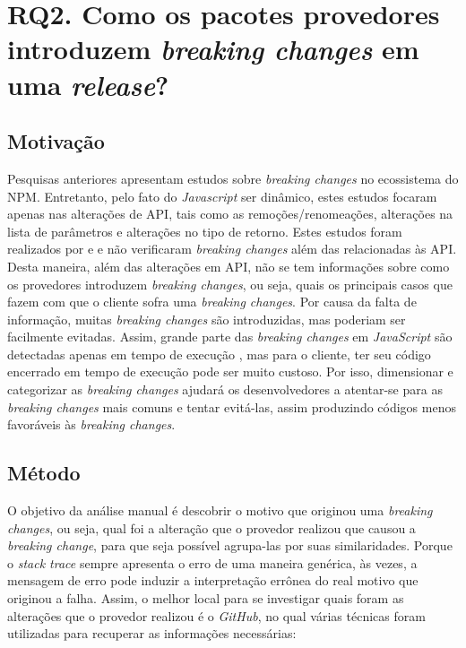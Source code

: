 \section{RQ2. Como os pacotes provedores introduzem \textit{breaking changes} em uma \textit{release}?}
\label{sec:rq2}

\subsection{Motivação}
\label{mot:rq2}
Pesquisas anteriores apresentam estudos sobre \textit{breaking changes} no ecossistema do \gls{NPM}. Entretanto, pelo fato do \textit{Javascript} ser dinâmico, estes estudos focaram apenas nas alterações de \gls{API}, tais como as remoções/renomeações, alterações na lista de parâmetros e alterações no tipo de retorno. Estes estudos foram realizados por   e  e não verificaram \textit{breaking changes} além das relacionadas às \gls{API}. Desta maneira, além das alterações em \gls{API}, não se tem informações sobre como os provedores introduzem \textit{breaking changes}, ou seja, quais os principais casos que fazem com que o cliente sofra uma \textit{breaking changes}. Por causa da falta de informação, muitas \textit{breaking changes} são introduzidas, mas poderiam ser facilmente evitadas. Assim, grande parte das \textit{breaking changes} em \textit{JavaScript} são detectadas apenas em tempo de execução \cite{noregrets2018}, mas para o cliente, ter seu código encerrado em tempo de execução pode ser muito custoso. Por isso, dimensionar e categorizar as \textit{breaking changes} ajudará os desenvolvedores a atentar-se para as \textit{breaking changes} mais comuns e tentar evitá-las, assim produzindo códigos menos favoráveis às \textit{breaking changes}.

\subsection{Método}
\label{apr:rq2}
O objetivo da análise manual é descobrir o motivo que originou uma \textit{breaking changes}, ou seja, qual foi a alteração que o provedor realizou que causou a \textit{breaking change}, para que seja possível agrupa-las por suas similaridades. Porque o \textit{stack trace} sempre apresenta o erro de uma maneira genérica, às vezes, a mensagem de erro pode induzir a interpretação errônea do real motivo que originou a falha. Assim, o melhor local para se investigar quais foram as alterações que o provedor realizou é o \textit{GitHub}, no qual várias técnicas foram utilizadas para recuperar as informações necessárias:

